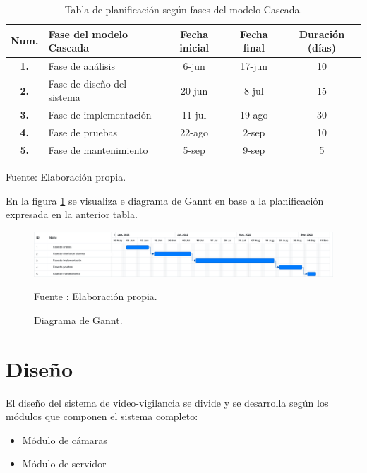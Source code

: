 \begin{table}[H]
    \caption{Tabla de planificación según fases del modelo Cascada.}
    \label{tabla:planning}    
    \begin{center}
        \begin{tabular}{|c|l|c|c|c|}
            \hline
            \textbf{Num.} & \textbf{Fase del modelo Cascada}  &  \textbf{Fecha inicial} & \textbf{Fecha final} & \textbf{Duración (días)}\\ \hline
            \textbf{1.} & Fase de análisis        & 6-jun        & 17-jun        & 10        \\ \hline
            \textbf{2.} & Fase de diseño del sistema       & 20-jun        & 8-jul        & 15        \\ \hline
            \textbf{3.} & Fase de implementación        & 11-jul        & 19-ago        & 30        \\ \hline
            \textbf{4.} & Fase de pruebas        & 22-ago         &   2-sep     &    10     \\ \hline
            \textbf{5.} & Fase de mantenimiento        & 5-sep        & 9-sep        & 5        \\ \hline
        \end{tabular}
    \end{center}
    \begin{center}
        Fuente: Elaboración propia.
    \end{center}
\end{table}

En la figura \ref{fig:gannt} se visualiza e diagrama de Gannt en base a la planificación expresada en la anterior tabla.
\begin{figure}[H]
    \begin{center}
        \includegraphics[width=18cm]{img/capitulo_4/gant.png}
    \end{center}
    \begin{center}
        \caption{Diagrama de Gannt.}
        Fuente : Elaboración propia.
        \label{fig:gannt}
    \end{center}
\end{figure}

\section{Diseño}
El diseño del sistema de video-vigilancia se divide y se desarrolla según los módulos que componen el sistema completo:
\begin{itemize}
    \item Módulo de cámaras
    \item Módulo de servidor
\end{itemize}

